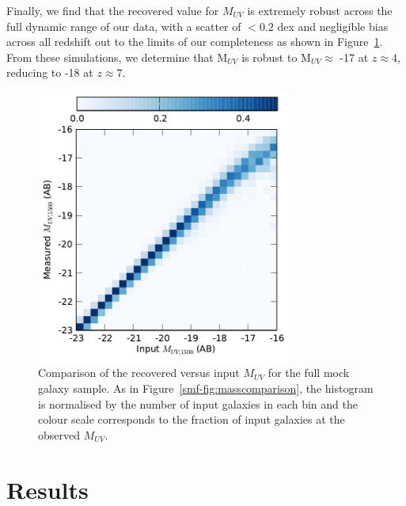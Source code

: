 Finally, we find that the recovered value for $M_{UV}$ is extremely robust across the full dynamic range of our data, with a scatter of $< 0.2$ dex and negligible bias across all redshift out to the limits of our completeness as shown in Figure~\ref{smf-fig:muvcomparison}. From these simulations, we determine that M$_{UV}$ is robust to M$_{UV} \approx$ -17 at $z \approx 4$, reducing to -18 at $z \approx 7$.

\begin{figure}
\centering
\includegraphics[width=84mm]{plots/fig6.pdf}
\caption[Comparison of the recovered versus input $M_{UV}$ for the full mock galaxy sample.]{Comparison of the recovered versus input $M_{UV}$ for the full mock galaxy sample. As in Figure~\ref{smf-fig:masscomparison}, the histogram is normalised by the number of input galaxies in each bin and the colour scale corresponds to the fraction of input galaxies at the observed $M_{UV}$.}
\label{smf-fig:muvcomparison}
\end{figure}

\section{Results}\label{smf-sec:results}
